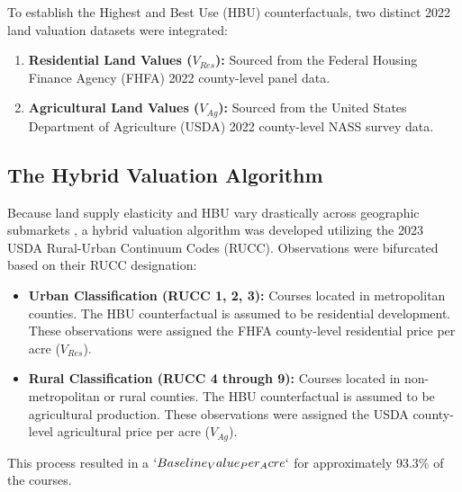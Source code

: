 \documentclass[10pt, letterpaper]{article}
\begin{document}
To establish the Highest and Best Use (HBU) counterfactuals, two distinct 2022 land valuation datasets were integrated:
\begin{enumerate}
    \item \textbf{Residential Land Values ($V_{Res}$):} Sourced from the Federal Housing Finance Agency (FHFA) 2022 county-level panel data.
    \item \textbf{Agricultural Land Values ($V_{Ag}$):} Sourced from the United States Department of Agriculture (USDA) 2022 county-level NASS survey data.
\end{enumerate}

\subsection{The Hybrid Valuation Algorithm}
Because land supply elasticity and HBU vary drastically across geographic submarkets \parencite{Davis2008}, a hybrid valuation algorithm was developed utilizing the 2023 USDA Rural-Urban Continuum Codes (RUCC). Observations were bifurcated based on their RUCC designation:
\begin{itemize}
    \item \textbf{Urban Classification (RUCC 1, 2, 3):} Courses located in metropolitan counties. The HBU counterfactual is assumed to be residential development. These observations were assigned the FHFA county-level residential price per acre ($V_{Res}$).
    \item \textbf{Rural Classification (RUCC 4 through 9):} Courses located in non-metropolitan or rural counties. The HBU counterfactual is assumed to be agricultural production. These observations were assigned the USDA county-level agricultural price per acre ($V_{Ag}$).
\end{itemize}
This process resulted in a $`Baseline_Value_Per_Acre`$ for approximately 93.3\% of the courses.
\end{document}
